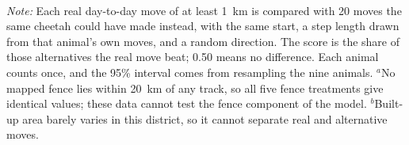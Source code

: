 \\[0.5em]
\noindent\parbox{\textwidth}{\footnotesize\emph{Note:} Each real day-to-day move of at least 1~km is compared with 20 moves the same cheetah could have made instead, with the same start, a step length drawn from that animal's own moves, and a random direction. The score is the share of those alternatives the real move beat; 0.50 means no difference. Each animal counts once, and the 95\% interval comes from resampling the nine animals. $^{a}$No mapped fence lies within 20~km of any track, so all five fence treatments give identical values; these data cannot test the fence component of the model. $^{b}$Built-up area barely varies in this district, so it cannot separate real and alternative moves.}
